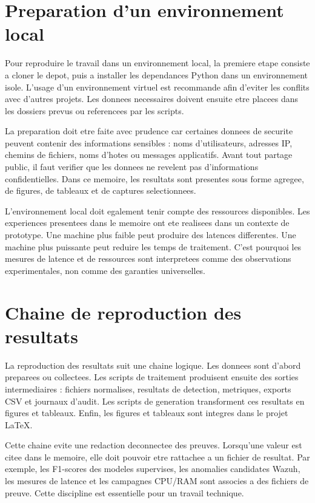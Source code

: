 \section{Preparation d'un environnement local}
Pour reproduire le travail dans un environnement local, la premiere etape consiste a cloner le depot, puis a installer les dependances Python dans un environnement isole. L'usage d'un environnement virtuel est recommande afin d'eviter les conflits avec d'autres projets. Les donnees necessaires doivent ensuite etre placees dans les dossiers prevus ou referencees par les scripts.

La preparation doit etre faite avec prudence car certaines donnees de securite peuvent contenir des informations sensibles : noms d'utilisateurs, adresses IP, chemins de fichiers, noms d'hotes ou messages applicatifs. Avant tout partage public, il faut verifier que les donnees ne revelent pas d'informations confidentielles. Dans ce memoire, les resultats sont presentes sous forme agregee, de figures, de tableaux et de captures selectionnees.

L'environnement local doit egalement tenir compte des ressources disponibles. Les experiences presentees dans le memoire ont ete realisees dans un contexte de prototype. Une machine plus faible peut produire des latences differentes. Une machine plus puissante peut reduire les temps de traitement. C'est pourquoi les mesures de latence et de ressources sont interpretees comme des observations experimentales, non comme des garanties universelles.

\section{Chaine de reproduction des resultats}
La reproduction des resultats suit une chaine logique. Les donnees sont d'abord preparees ou collectees. Les scripts de traitement produisent ensuite des sorties intermediaires : fichiers normalises, resultats de detection, metriques, exports CSV et journaux d'audit. Les scripts de generation transforment ces resultats en figures et tableaux. Enfin, les figures et tableaux sont integres dans le projet LaTeX.

Cette chaine evite une redaction deconnectee des preuves. Lorsqu'une valeur est citee dans le memoire, elle doit pouvoir etre rattachee a un fichier de resultat. Par exemple, les F1-scores des modeles supervises, les anomalies candidates Wazuh, les mesures de latence et les campagnes CPU/RAM sont associes a des fichiers de preuve. Cette discipline est essentielle pour un travail technique.

